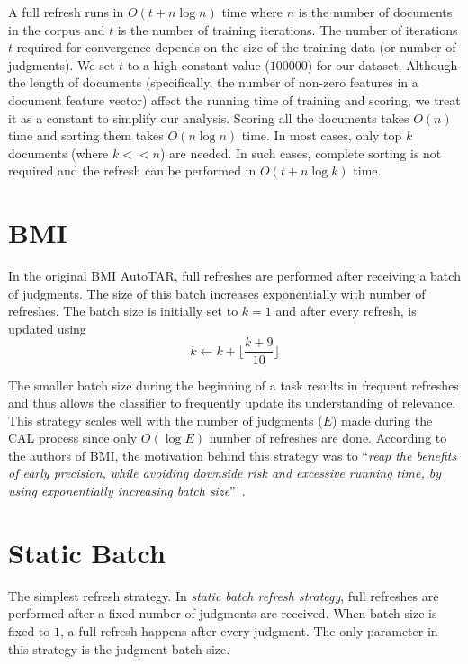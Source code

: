 A full refresh runs in $O(t + n\log n)$ time where $n$ is the number of
documents in the corpus and $t$ is the number of training iterations. The number
of iterations $t$ required for convergence depends on the size of the training data
(or number of judgments). We set $t$ to a high constant value ($100000$) for our
dataset. Although the length of documents (specifically, the number of
non-zero features in a document feature vector) affect the running time of training
and scoring, we treat it as a constant to simplify our analysis. Scoring all the
documents takes $O(n)$ time and sorting them takes $O(n \log n)$ time. In most
cases, only top $k$ documents (where $k<<n$) are needed. In such cases, complete
sorting is not required and the refresh can be performed in $O(t + n \log k)$
time.

\section{BMI}

In the original BMI AutoTAR, full refreshes are performed after receiving a
batch of judgments. The size of this batch increases exponentially with number
of refreshes. The batch size is initially set to $k=1$ and after every refresh,
is updated using
\begin{equation*}
k \leftarrow k + \lfloor\frac{k + 9}{10}\rfloor
\end{equation*}

The smaller batch size during the beginning of a task results in frequent
refreshes and thus allows the classifier to frequently update its understanding
of relevance. This strategy scales well with the number of judgments ($E$) made
during the CAL process since only $O(\log E)$ number of refreshes are done.
According to the authors of BMI, the motivation behind this strategy was to
``\textit{reap the benefits of early precision, while avoiding downside risk and
    excessive running time, by using exponentially increasing batch
size}''~\cite{cormack2015autonomy}.

\section{Static Batch}

The simplest refresh strategy. In \textit{static batch refresh strategy}, full
refreshes are performed after a fixed number of judgments are received. When
batch size is fixed to $1$, a full refresh happens after every judgment. The
only parameter in this strategy is the judgment batch size.

